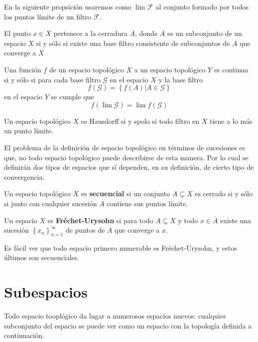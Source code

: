 \documentclass[12pt]{report}
\theoremstyle{largebreak}
\begin{document}
    En la siguiente propsición usaremos como $\lim\mathcal{F}$ al conjunto formado por todos los puntos límite de un filtro $\mathcal{F}$.

    \begin{propo}
        El punto $x\in X$ pertenece a la cerradura $\overline{A}$, donde $A$ es un subconjunto de un espacio $X$ si y sólo si existe una base filtro consistente de subconjuntos de $A$ que converge a $X$

        Una función $f$ de un espacio topológico $X$ a un espacio topológico $Y$ es continua si y sólo si para cada base filtro $\mathcal{G}$ en el espacio $X$ y la base filtro
         \begin{equation*}
            f(\mathcal{G})=\left\{f(A)|A\in\mathcal{G} \right\}
         \end{equation*}
         en el espacio $Y$ se cumple que
         \begin{equation*}
            f(\lim\mathcal{G})=\lim f(\mathcal{G})
         \end{equation*}
         
         Un espacio topológico $X$ es Hausdorff si y spolo si todo filtro en $X$ tiene a lo más un punto límite.
    \end{propo}

    El problema de la definición de espacio topológico en términos de sucesiones es que, no todo espacio topológico puede describirse de esta manera. Por lo cual se definirán dos tipos de espacios que sí dependen, en su definición, de cierto tipo de convergencia.

    \begin{mydef}
        Un espacio topológico $X$ es \textbf{secuencial} si un conjunto $A\subseteq X$ es cerrado si y sólo si junto con cualquier sucesión $A$ contiene sus puntos límite.

        Un espacio $X$ es \textbf{Fréchet-Urysohn} si para todo $A\subseteq  X$ y todo $x\in\overline{A}$ existe una sucesión $\left\{x_n\right\}_{n=1}^{\infty}$ de puntos de $A$ que converge a $x$.
    \end{mydef}

    Es fácil ver que todo espacio primero numerable es Fréchet-Urysohn, y estos últimos son secuenciales.

    \section{Subespacios}

    Todo espacio tooplógico da lugar a numerosos espacios nuevos: cualquier subconjunto del espacio se puede ver como un espacio con la topología definida a continuación.
\end{document}
